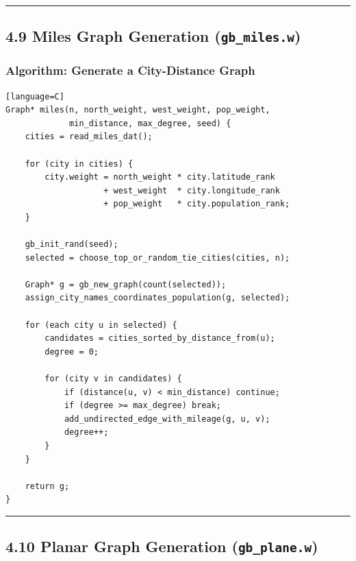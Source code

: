 \documentclass[11pt]{article}
\begin{document}
\begin{center}\rule{0.5\linewidth}{0.5pt}\end{center}

\subsection{\texorpdfstring{4.9 Miles Graph Generation (\texttt{gb\_miles.w})}{4.9 Miles Graph Generation (gb\_miles.w)}}\label{miles-graph-generation-gb_miles.w}

\subsubsection{Algorithm: Generate a City-Distance Graph}\label{algorithm-generate-a-city-distance-graph}

\begin{verbatim}[language=C]
Graph* miles(n, north_weight, west_weight, pop_weight,
             min_distance, max_degree, seed) {
    cities = read_miles_dat();

    for (city in cities) {
        city.weight = north_weight * city.latitude_rank
                    + west_weight  * city.longitude_rank
                    + pop_weight   * city.population_rank;
    }

    gb_init_rand(seed);
    selected = choose_top_or_random_tie_cities(cities, n);

    Graph* g = gb_new_graph(count(selected));
    assign_city_names_coordinates_population(g, selected);

    for (each city u in selected) {
        candidates = cities_sorted_by_distance_from(u);
        degree = 0;

        for (city v in candidates) {
            if (distance(u, v) < min_distance) continue;
            if (degree >= max_degree) break;
            add_undirected_edge_with_mileage(g, u, v);
            degree++;
        }
    }

    return g;
}
\end{verbatim}

\begin{center}\rule{0.5\linewidth}{0.5pt}\end{center}

\subsection{\texorpdfstring{4.10 Planar Graph Generation (\texttt{gb\_plane.w})}{4.10 Planar Graph Generation (gb\_plane.w)}}\label{planar-graph-generation-gb_plane.w}
\end{document}
